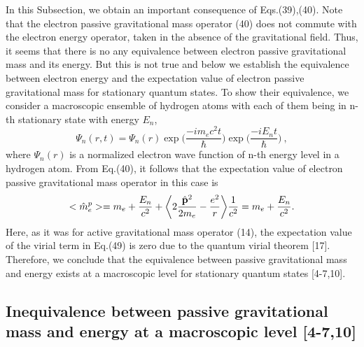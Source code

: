 \documentclass{ws-ijmpd}
\begin{document}
In this Subsection, we obtain an important consequence of
Eqs.(39),(40). Note that the electron passive gravitational mass
operator (40) does not commute with the electron energy operator,
taken in the absence of the gravitational field. Thus, it seems
that there is no any equivalence between electron passive
gravitational mass and its energy. But this is not true and below
we establish the equivalence between electron energy and the
expectation value of electron passive gravitational mass for
stationary quantum states. To show their equivalence, we consider
a macroscopic ensemble of hydrogen atoms with each of them being
in n-th stationary state with energy $E_n$,
\begin{equation}
\Psi_n(r,t) = \Psi_n(r) \exp \biggl( \frac{-im_ec^2t}{\hbar}
\biggl) \exp \biggl( \frac{- iE_nt}{\hbar} \biggl)\ ,
\end{equation}
where $\Psi_n(r)$ is a normalized electron wave
function of n-th energy level in a hydrogen atom.
From Eq.(40), it follows that the expectation value of electron
passive gravitational mass operator in this case is
\begin{equation}
<\hat m^p_e > = m_e + \frac{ E_n}{c^2}  + \biggl< 2 \frac{\hat
{\bf p}^2}{2m_e}-\frac{e^2}{r} \biggl> \frac{1}{c^2} = m_e +
\frac{E_n}{c^2} .
\end{equation}
Here, as it was for active gravitational mass operator (14), the
expectation value of the virial term in Eq.(49) is zero due to the
quantum virial theorem [17]. Therefore, we conclude that the
equivalence between passive gravitational mass and energy exists
at a macroscopic level for stationary quantum states [4-7,10].


\subsection{Inequivalence between passive gravitational mass
and energy at a macroscopic level [4-7,10]}
\end{document}
